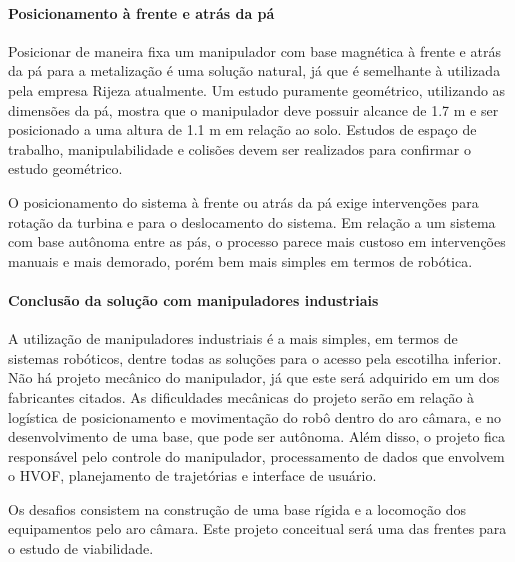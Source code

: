\paragraph{Posicionamento à frente e atrás da pá}

Posicionar de maneira fixa um manipulador com base magnética à frente e atrás da
pá para a metalização é uma solução natural, já que é semelhante à utilizada pela
empresa Rijeza atualmente. Um estudo puramente geométrico, utilizando as
dimensões da pá, mostra que o manipulador deve possuir alcance de 1.7 m e ser
posicionado a uma altura de 1.1 m em relação ao solo. Estudos de espaço de
trabalho, manipulabilidade e colisões devem ser realizados para confirmar o
estudo geométrico.

O posicionamento do sistema à frente ou atrás da pá exige intervenções para
rotação da turbina e para o deslocamento do sistema. Em relação a um
sistema com base autônoma entre as pás, o processo parece mais custoso em
intervenções manuais e mais demorado, porém bem mais simples em termos de
robótica.

\paragraph{Conclusão da solução com manipuladores industriais}
A utilização de manipuladores industriais é a mais simples, em termos de
sistemas robóticos, dentre todas as soluções para o acesso pela escotilha
inferior.
Não há projeto mecânico do manipulador, já que este será adquirido em um dos fabricantes citados. As dificuldades mecânicas do projeto serão em relação à logística de posicionamento
e movimentação do robô dentro do aro câmara, e no desenvolvimento de uma base,
que pode ser autônoma. Além disso, o projeto fica responsável pelo controle do
manipulador, processamento de dados que envolvem o HVOF, planejamento de
trajetórias e interface de usuário.

Os desafios consistem na construção de uma base rígida e a locomoção dos
equipamentos pelo aro câmara. Este projeto conceitual será uma das frentes para
o estudo de viabilidade.

